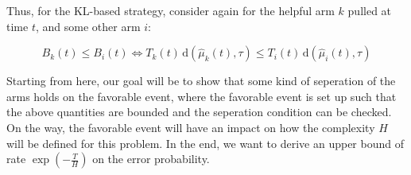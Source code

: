 \documentclass[12pt,]{article}
\newcommand{\der}{\,\text{d}}
\begin{document}
Thus, for the KL-based strategy, consider again for the helpful arm
\(k\) pulled at time \(t\), and some other arm \(i\):

\[
B_k(t) \leq B_i(t) \Leftrightarrow T_k(t) \der(\hat{\mu}_k(t), \tau) \leq T_i(t) \der(\hat{\mu}_i(t), \tau)
\]

Starting from here, our goal will be to show that some kind of
seperation of the arms holds on the favorable event, where the favorable
event is set up such that the above quantities are bounded and the
seperation condition can be checked. On the way, the favorable event
will have an impact on how the complexity \(H\) will be defined for this
problem. In the end, we want to derive an upper bound of rate
\(\exp(-\frac{T}{H})\) on the error probability.
\end{document}
